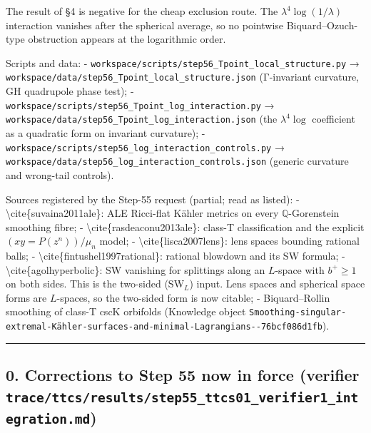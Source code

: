 \documentclass[
  10pt,
]{report}
\begin{document}
The result of §4 is negative for the cheap exclusion route. The
\(\lambda^4\log(1/\lambda)\) interaction vanishes after the spherical
average, so no pointwise Biquard--Ozuch-type obstruction appears at the
logarithmic order.

Scripts and data: -
\texttt{workspace/scripts/step56\_Tpoint\_local\_structure.py} →
\texttt{workspace/data/step56\_Tpoint\_local\_structure.json}
(Γ-invariant curvature, GH quadrupole phase test); -
\texttt{workspace/scripts/step56\_Tpoint\_log\_interaction.py} →
\texttt{workspace/data/step56\_Tpoint\_log\_interaction.json} (the
\(\lambda^4\log\) coefficient as a quadratic form on invariant
curvature); -
\texttt{workspace/scripts/step56\_log\_interaction\_controls.py} →
\texttt{workspace/data/step56\_log\_interaction\_controls.json} (generic
curvature and wrong-tail controls).

Sources registered by the Step-55 request (partial; read as listed): -
\textbackslash cite\{suvaina2011ale\}: ALE Ricci-flat Kähler metrics on
every \(\mathbb Q\)-Gorenstein smoothing fibre; -
\textbackslash cite\{rasdeaconu2013ale\}: class-T classification and the
explicit \((xy=P(z^n))/\mu_n\) model; -
\textbackslash cite\{lisca2007lens\}: lens spaces bounding rational
balls; - \textbackslash cite\{fintushel1997rational\}: rational blowdown
and its SW formula; - \textbackslash cite\{agolhyperbolic\}: SW
vanishing for splittings along an \(L\)-space with \(b^+\ge1\) on both
sides. This is the two-sided (SW\(_L\)) input. Lens spaces and spherical
space forms are \(L\)-spaces, so the two-sided form is now citable; -
Biquard--Rollin smoothing of class-T cscK orbifolds (Knowledge object
\texttt{Smoothing-singular-extremal-Kähler-surfaces-and-minimal-Lagrangians-\/-76bcf086d1fb}).

\begin{center}\rule{0.5\linewidth}{0.5pt}\end{center}

\hypertarget{corrections-to-step-55-now-in-force-verifier-tracettcsresultsstep55_ttcs01_verifier1_integration.md}{%
\subsection{\texorpdfstring{0. Corrections to Step 55 now in force
(verifier
\texttt{trace/ttcs/results/step55\_ttcs01\_verifier1\_integration.md})}{0. Corrections to Step 55 now in force (verifier trace/ttcs/results/step55\_ttcs01\_verifier1\_integration.md)}}\label{corrections-to-step-55-now-in-force-verifier-tracettcsresultsstep55_ttcs01_verifier1_integration.md}}
\end{document}
